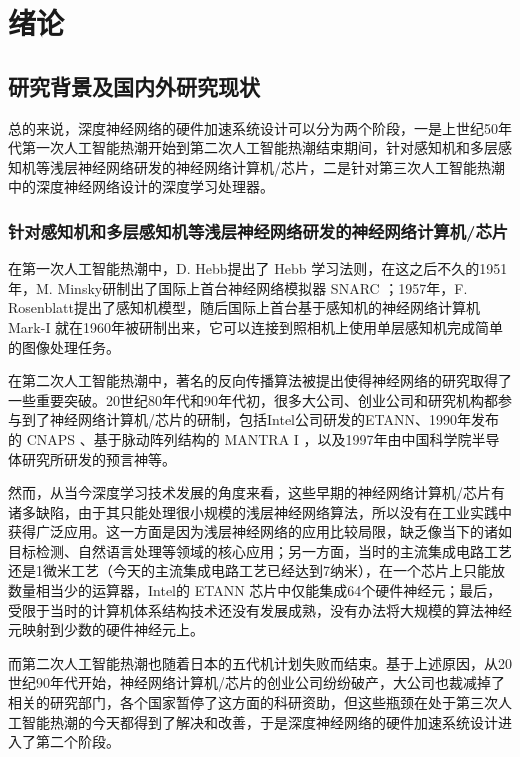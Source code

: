 \chapter{绪论}\label{chap:preface}

\section{研究背景及国内外研究现状}

总的来说，深度神经网络的硬件加速系统设计可以分为两个阶段，一是上世纪50年代第一次人工智能热潮开始到第二次人工智能热潮结束期间，针对感知机和多层感知机等浅层神经网络研发的神经网络计算机/芯片，二是针对第三次人工智能热潮中的深度神经网络设计的深度学习处理器。

\subsection{针对感知机和多层感知机等浅层神经网络研发的神经网络计算机/芯片}

在第一次人工智能热潮中，D. Hebb提出了 Hebb 学习法则，在这之后不久的1951年，M. Minsky研制出了国际上首台神经网络模拟器 SNARC ；1957年，F. Rosenblatt提出了感知机模型，随后国际上首台基于感知机的神经网络计算机 Mark-I 就在1960年被研制出来，它可以连接到照相机上使用单层感知机完成简单的图像处理任务。

在第二次人工智能热潮中，著名的反向传播算法被提出使得神经网络的研究取得了一些重要突破。20世纪80年代和90年代初，很多大公司、创业公司和研究机构都参与到了神经网络计算机/芯片的研制，包括Intel公司研发的ETANN、1990年发布的 CNAPS 、基于脉动阵列结构的 MANTRA I ，以及1997年由中国科学院半导体研究所研发的预言神等。

然而，从当今深度学习技术发展的角度来看，这些早期的神经网络计算机/芯片有诸多缺陷，由于其只能处理很小规模的浅层神经网络算法，所以没有在工业实践中获得广泛应用。这一方面是因为浅层神经网络的应用比较局限，缺乏像当下的诸如目标检测、自然语言处理等领域的核心应用；另一方面，当时的主流集成电路工艺还是1微米工艺（今天的主流集成电路工艺已经达到7纳米），在一个芯片上只能放数量相当少的运算器，Intel的 ETANN 芯片中仅能集成64个硬件神经元；最后，受限于当时的计算机体系结构技术还没有发展成熟，没有办法将大规模的算法神经元映射到少数的硬件神经元上。

而第二次人工智能热潮也随着日本的五代机计划失败而结束。基于上述原因，从20世纪90年代开始，神经网络计算机/芯片的创业公司纷纷破产，大公司也裁减掉了相关的研究部门，各个国家暂停了这方面的科研资助，但这些瓶颈在处于第三次人工智能热潮的今天都得到了解决和改善，于是深度神经网络的硬件加速系统设计进入了第二个阶段。

